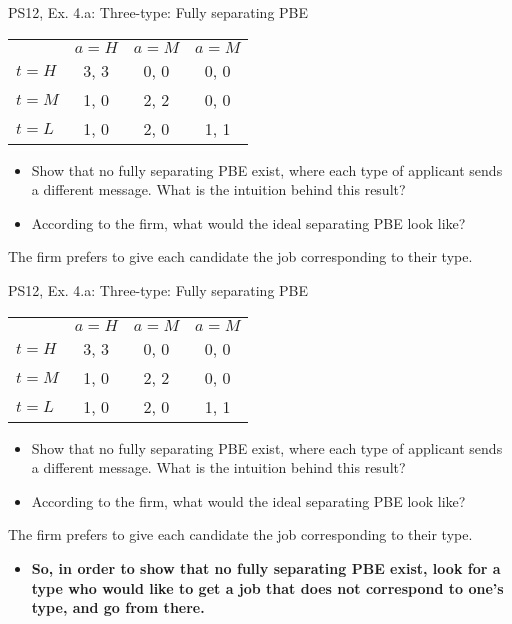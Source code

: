 \begin{frame}{PS12, Ex. 4.a: Three-type: Fully separating PBE}
    \begin{table}
      \begin{tabular}{l|c|c|c|}
          \multicolumn{1}{c}{} & \multicolumn{1}{c}{$a=H$} & \multicolumn{1}{c}{$a=M$} & \multicolumn{1}{c}{$a=M$} \\\cline{2-4}
          $t=H$ & 3, 3 & 0, 0 & 0, 0 \\\cline{2-4}
          $t=M$ & 1, 0 & 2, 2 & 0, 0 \\\cline{2-4}
          $t=L$ & 1, 0 & 2, 0 & 1, 1 \\\cline{2-4}
      \end{tabular}
    \end{table}\vspace{-8pt}
    \begin{itemize}
      \item[(a)] Show that no fully separating PBE exist, where each type of applicant sends a different message. What is the intuition behind this result?
      \item[Step 1:] According to the firm, what would the ideal separating PBE look like?
    \end{itemize}\vspace{-6pt}
    The firm prefers to give each candidate the job corresponding to their type.
    \vfill\null
\end{frame}
\begin{frame}{PS12, Ex. 4.a: Three-type: Fully separating PBE}
    \begin{table}
      \begin{tabular}{l|c|c|c|}
          \multicolumn{1}{c}{} & \multicolumn{1}{c}{$a=H$} & \multicolumn{1}{c}{$a=M$} & \multicolumn{1}{c}{$a=M$} \\\cline{2-4}
          $t=H$ & 3, 3 & 0, 0 & 0, 0 \\\cline{2-4}
          $t=M$ & 1, 0 & 2, 2 & 0, 0 \\\cline{2-4}
          $t=L$ & 1, 0 & 2, 0 & 1, 1 \\\cline{2-4}
      \end{tabular}
    \end{table}\vspace{-8pt}
    \begin{itemize}
      \item[(a)] Show that no fully separating PBE exist, where each type of applicant sends a different message. What is the intuition behind this result?
      \item[Step 1:] According to the firm, what would the ideal separating PBE look like?
    \end{itemize}\vspace{-6pt}
    The firm prefers to give each candidate the job corresponding to their type.\vspace{-4pt}
    \begin{itemize}
      \item[Step 2:] \textbf{So, in order to show that no fully separating PBE exist, look for a type who would like to get a job that does not correspond to one's type, and go from there.}
    \end{itemize}
    \vfill\null
\end{frame}
